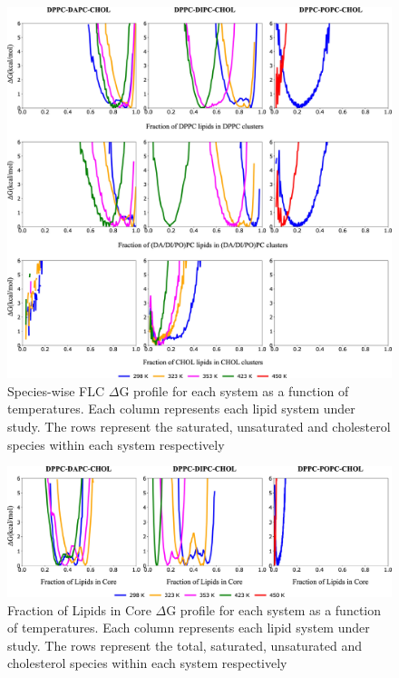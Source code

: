 \documentclass[10pt]{article}
\begin{document}
\begin{figure}[H]
    \centering
    \includegraphics[width=6.5in]{Figures/Supplementary/AVs/SpeciesWiseFLC/placeholder.jpg}
    \caption{Species-wise FLC $\Delta$G profile for each system as a function of temperatures. Each column represents each lipid system under study. The rows represent the saturated, unsaturated and cholesterol species within each system respectively}
    \label{figs3:view}
\end{figure}

\begin{figure}[H]
    \centering
    \includegraphics[width=6.5in]{Figures/Supplementary/AVs/FLCore/placeholder.jpg}
    \caption{Fraction of Lipids in Core $\Delta$G profile for each system as a function of temperatures. Each column represents each lipid system under study. The rows represent the total, saturated, unsaturated and cholesterol species within each system respectively}
    \label{figs4:view}
\end{figure}
\end{document}
